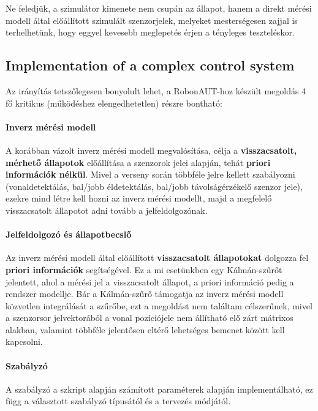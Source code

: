 Ne feledjük, a szimulátor kimenete nem csupán az állapot, hanem a direkt mérési modell által előállított szimulált szenzorjelek, melyeket mesterségesen zajjal is terhelhetünk, hogy eggyel kevesebb meglepetés érjen a tényleges teszteléskor.

\subsection{Implementation of a complex control system}

Az irányítás tetszőlegesen bonyolult lehet, a RobonAUT-hoz készült megoldás 4 fő kritikus (működéshez elengedhetetlen) részre bontható:

\paragraph{Inverz mérési modell}

A korábban vázolt inverz mérési modell megvalósítása, célja a \textbf{visszacsatolt, mérhető állapotok} előállítása a szenzorok jelei alapján, tehát \textbf{priori információk nélkül}. Mivel a verseny során többféle jelre kellett szabályozni (vonaldetektálás, bal/jobb éldetektálás, bal/jobb távolságérzékelő szenzor jele), ezekre mind létre kell hozni az inverz mérési modellt, majd a megfelelő visszacsatolt állapotot adni tovább a jelfeldolgozónak.

\paragraph{Jelfeldolgozó és állapotbecslő}

Az inverz mérési modell által előállított \textbf{visszacsatolt állapotokat} dolgozza fel \textbf{priori információk} segítségével. Ez a mi esetünkben egy Kálmán-szűrőt jelentett, ahol a mérési jel a visszacsatolt állapot, a priori információ pedig a rendszer modellje. Bár a Kálmán-szűrő támogatja az inverz mérési modell közvetlen integrálását a szűrőbe, ezt a megoldást nem találtam célszerűnek, mivel a szenzorsor jelvektorából a vonal pozíciójele nem állítható elő zárt mátrixos alakban, valamint többféle jelentősen eltérő lehetséges bemenet között kell kapcsolni.

\paragraph{Szabályzó}

A szabályzó a szkript alapján számított paraméterek alapján implementálható, ez függ a választott szabályzó típusától és a tervezés módjától.

